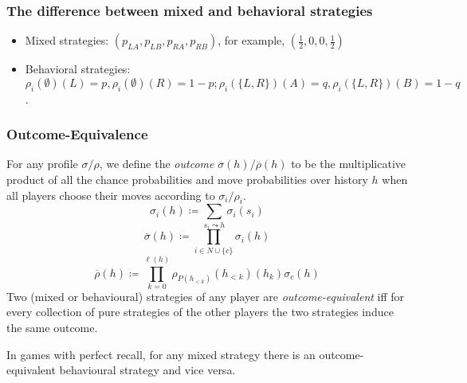 \documentclass[UTF8,11pt,colorlinks,compress,openany]{beamer}%
\begin{document}
\begin{frame}\frametitle{The difference between mixed and behavioral strategies}
\begin{figure}[H]
\end{figure}
\begin{itemize}
	\item Mixed strategies: $(p_{LA},p_{LB},p_{RA},p_{RB})$, for example, $(\frac{1}{2},0,0,\frac{1}{2})$
	\item Behavioral strategies: $\rho_i(\emptyset)(L)=p,\rho_i(\emptyset)(R)=1-p;\rho_i(\{L,R\})(A)=q,\rho_i(\{L,R\})(B)=1-q$.
\end{itemize}
\end{frame}

\begin{frame}\frametitle{Outcome-Equivalence}
For any profile $\sigma/\rho$, we define the \emph{outcome} $\overline{\sigma}(h)/\overline{\rho}(h)$ to be the multiplicative product of all the chance probabilities and move probabilities over history $h$ when all players choose their moves according to $\sigma_i/\rho_i$.
\[\sigma_i(h)\coloneqq \sum\limits_{s_i\leadsto h}\sigma_i(s_i)\]
\[\overline{\sigma}(h)\coloneqq \prod\limits_{i\in N\cup\{c\}}\sigma_i(h)\]
\[\overline{\rho}(h)\coloneqq \prod\limits_{k=0}^{\ell(h)}\rho_{P(h_{<k})}(h_{<k})(h_k)\sigma_c(h)\]
Two (mixed or behavioural) strategies of any player are \emph{outcome-equivalent} iff for every collection of pure strategies of the other players the two strategies induce the same outcome.
\begin{theorem}
	In games with perfect recall, for any mixed strategy there is an outcome-equivalent behavioural strategy and vice versa.
\end{theorem}
\end{frame}
\end{document}
